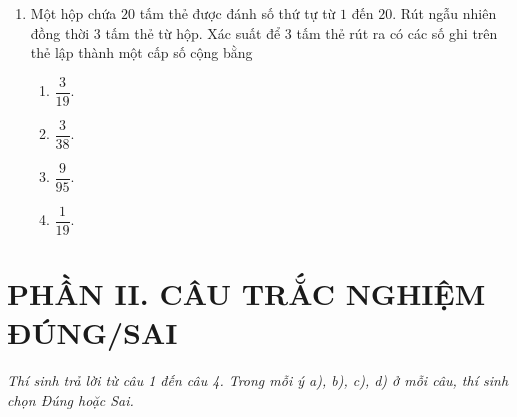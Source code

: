 \documentclass[12pt,a4paper]{article}
\begin{document}
\begin{enumerate}[label=\textbf{Câu \arabic*:}, leftmargin=*]
\item Một hộp chứa $20$ tấm thẻ được đánh số thứ tự từ $1$ đến $20$. Rút ngẫu nhiên đồng thời $3$ tấm thẻ từ hộp. Xác suất để $3$ tấm thẻ rút ra có các số ghi trên thẻ lập thành một cấp số cộng bằng
\begin{enumerate}[label=\Alph*.]
    \item $\dfrac{3}{19}$.
    \item $\dfrac{3}{38}$.
    \item $\dfrac{9}{95}$.
    \item $\dfrac{1}{19}$.
\end{enumerate}

\end{enumerate}

\section*{\large PHẦN II. CÂU TRẮC NGHIỆM ĐÚNG/SAI}
\textit{Thí sinh trả lời từ câu 1 đến câu 4. Trong mỗi ý a), b), c), d) ở mỗi câu, thí sinh chọn Đúng hoặc Sai.}
\end{document}
